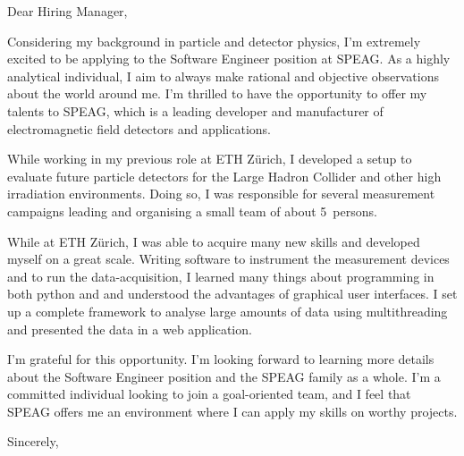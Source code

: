 \documentclass[14pt]{extarticle}
\author{Michael Reichmann}
\date{\today}
\makeatletter
\let\thisauthor\@author
\def\position{Software Engineer\xspace}
\def\company{SPEAG\xspace}
\def\oldcomp{ETH Z\"urich\xspace}
\makeatother
\begin{document}
%
\maketitle %
Dear Hiring Manager,\par
%
Considering my background in particle and detector physics, I'm extremely excited to be applying to the \position position at \company. As a highly analytical individual, I aim to always make rational and objective observations about the world around me. I'm thrilled to have the opportunity to offer my talents to \company, which is a leading developer and manufacturer of electromagnetic field detectors and applications.\par
%
While working in my previous role at \oldcomp, I developed a setup to evaluate future particle detectors for the Large Hadron Collider and other high irradiation environments. Doing so, I was responsible for several measurement campaigns leading and organising a small team of about \SI{5}{persons}. \par
%
While at \oldcomp, I was able to acquire many new skills and developed myself on a great scale. Writing software to instrument the measurement devices and to run the data-acquisition, I learned many things about programming in both python and \cpp and understood the advantages of graphical user interfaces. I set up a complete framework to analyse large amounts of data using multithreading and presented the data in a web application.\par
%
I'm grateful for this opportunity. I'm looking forward to learning more details about the \position position and the \company family as a whole. I'm a committed individual looking to join a goal-oriented team, and I feel that \company offers me an environment where I can apply my skills on worthy projects.\par
%
Sincerely,\par
%
\thisauthor
%
\end{document}
